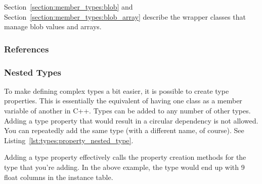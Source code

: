 Section~\ref{section:member_types:blob} and Section~\ref{section:member_types:blob_array} describe the wrapper classes that manage blob values and arrays.

\subsubsection{References}
\label{section:types:property_types:references}


\subsubsection{Nested Types}
\label{section:types:property_types:types}

To make defining complex types a bit easier, it is possible to create type properties. This is essentially the equivalent of having one class as a member variable of another in C++. Types can be added to any number of other types. Adding a type property that would result in a circular dependency is not allowed. You can repeatedly add the same type (with a different name, of course). See Listing~\ref{lst:types:property_nested_type}.



Adding a type property effectively calls the property creation methods for the type that you're adding. In the above example, the  type would end up with 9 float columns in the instance table.